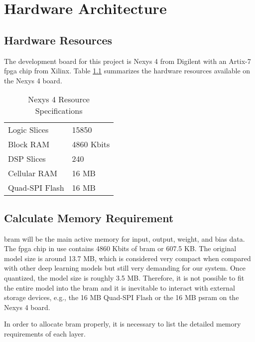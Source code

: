 
\chapter{Hardware Architecture}

\section{Hardware Resources}

The development board for this project is Nexys 4 from Digilent with an Artix-7 \gls{fpga} chip from Xilinx.
Table \ref{table:hardware_resources} summarizes the hardware resources available on the Nexys 4 board.

\begin{table}[h]
  \centering
  \caption{Nexys 4 Resource Specifications}
  \begin{tabular}{l | l}
    Logic Slices & 15850 \\
    Block RAM & 4860 Kbits \\
    DSP Slices & 240 \\
    Cellular RAM & 16 MB \\
    Quad-SPI Flash & 16 MB
  \end{tabular}
  \label{table:hardware_resources}
\end{table}

\section{Calculate Memory Requirement}

\gls{bram} will be the main active memory for input, output, weight, and bias data. The \gls{fpga} chip in use
contains 4860 Kbits of \gls{bram} or 607.5 KB. The original model size is around 13.7 MB, which is
considered very compact when compared with other deep learning models but still very demanding for
our system. Once quantized, the model size is roughly 3.5 MB. Therefore, it is not possible to fit the entire model
into the \gls{bram} and it is inevitable to interact with external storage devices, e.g., the 16 MB Quad-SPI
Flash or the 16 MB \gls{psram} on the Nexys 4 board.

In order to allocate \gls{bram} properly, it is necessary to list the detailed memory requirements of each
layer.


